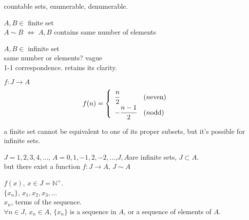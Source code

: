 
countable sets, enumerable, denumerable.

$A, B \in$ finite set\\
$A\sim B$ $\Longleftrightarrow$ $A, B$ contains same number of elements

$A, B \in$ infinite set\\
same number or elements? vague\\
1-1 correspondence. retains its clarity.

\begin{myExample}
    $f:J\rightarrow A$
    \begin{equation*}
        f(n) = \left\{
            \begin{array}{ll}
                \cfrac{n}{2} & (n \text{even})\\
                -\cfrac{n-1}{2} & (n \text{odd})
            \end{array}
        \right.
    \end{equation*}
\end{myExample}

\begin{myRemark}
    a finite set cannot be equivalent to one of its proper subsets, but it's possible for infinite sets.
\end{myRemark}

$J = 1,2,3,4,...$, $A = 0,1,-1,2,-2,...$,$J, A$are infinite sets, $J \subset A$.\\
but there exist a function $f:J\rightarrow A$, $J \sim A$

\begin{mydef}
    \label{mydef:2.7}
    $f(x)$, $x\in J = \mathbb{N}^+$.\\
    $\{x_n\}$, $x_1,x_2,x_3,...$\\
    $x_n$, terms of the sequence.\\
    $\forall n\in J$, $x_n\in A$, $\{x_n\}$ is a sequence in $A$, or a sequence of elements of $A$.
\end{mydef}


